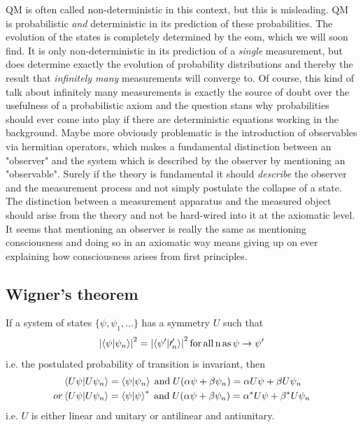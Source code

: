 QM is often called non-deterministic in this context, but this is misleading. QM is probabilistic \emph{and} deterministic in its prediction of these probabilities. The evolution of the states is completely determined by the eom, which we will soon find. It is only non-deterministic in its prediction of a \emph{single} measurement, but does determine exactly the evolution of probability distributions and thereby the result that \emph{infinitely many } measurements will converge to. Of course, this kind of talk about infinitely many measurements is exactly the source of doubt over the usefulness of a probabilistic axiom and the question stans why probabilities should ever come into play if there are deterministic equations working in the background. Maybe more obviously problematic is the introduction of observables via hermitian operators, which makes a fundamental distinction between an "observer" and the system which is described by the observer by mentioning an "observable". Surely if the theory is fundamental it should \emph{describe} the observer and the measurement process and not simply postulate the collapse of a state. The distinction between a measurement apparatus and the measured object should arise from the theory and not be hard-wired into it at the axiomatic level. It seems that mentioning an observer is really the same as mentioning consciousness and doing so in an axiomatic way means giving up on ever explaining how consciousness arises from first principles.


\subsection{Wigner's theorem}
If a system of states $\{\psi,\psi_1,\dots\}$ has a symmetry $U$ such that
\begin{equation}
	\abs{\braket{\psi}{\psi_n}}^2 = \abs{\braket{\psi^\prime}{\prime^\prime_n}}^2 \mathrm{\, for\,all\,n\, as\, \psi \rightarrow \psi^\prime}
\end{equation}
i.e. the postulated probability of transition is invariant, then
\begin{align}
	\braket{U\psi}{U\psi_n} &= \braket{\psi}{\psi_n} \; \mathrm{and} \; U(\alpha \psi + \beta \psi_n) = \alpha U \psi + \beta U \psi_n \\
	or \braket{U\psi}{U\psi_n} &= \braket{\psi}{\psi}^* \; \mathrm{and\;} U(\alpha \psi+ \beta \psi_n) = \alpha^* U\psi + \beta^* U \psi_n
\end{align}
i.e. $U$ is either linear and unitary or antilinear and antiunitary.
